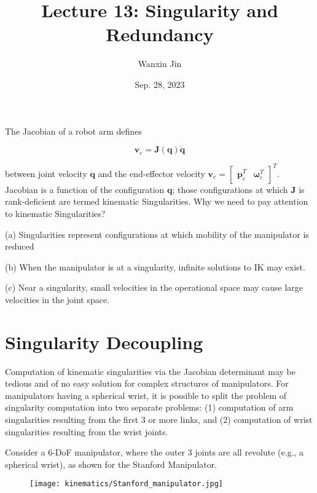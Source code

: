 \documentclass[10pt]{article}
\begin{document}
\title{Lecture 13:  Singularity and Redundancy}
\date{Sep. 28, 2023}
\author{Wanxin Jin}
\maketitle



The Jacobian of a robot arm defines

$$
\boldsymbol{v}_{e}=\boldsymbol{J}(\boldsymbol{q}) \dot{\boldsymbol{q}}
$$

between  joint velocity $\dot{\boldsymbol{q}}$ and the end-effector velocity $\boldsymbol{v}_{e}=\left[\begin{array}{ll}\dot{\boldsymbol{p}}_{e}^{T} & \boldsymbol{\omega}_{e}^{T}\end{array}\right]^{T}$. Jacobian is a function of the configuration $\boldsymbol{q}$; those configurations at which $\boldsymbol{J}$ is rank-deficient are termed kinematic Singularities. Why we need to pay attention to kinematic Singularities?

(a) Singularities represent configurations at which mobility of the manipulator is reduced

(b) When the manipulator is at a singularity, infinite solutions to IK may exist.

(c) Near a singularity, small velocities in the operational space may cause large velocities in the joint space.








\section{Singularity Decoupling}
Computation of kinematic singularities via the Jacobian determinant may be tedious and of no easy solution for complex structures of manipulators. For manipulators having a spherical wrist, it is possible to split the problem of singularity computation into two separate problems: (1) computation of arm singularities resulting from the first 3 or more links, and (2) computation of wrist singularities resulting from the wrist joints.



Consider a $6$-DoF manipulator, where the outer 3 joints are all revolute (e.g., a spherical wrist), as shown for the Stanford Manipulator. 

\begin{figure}[H]
    \centering
    \texttt{[image: kinematics/Stanford\_manipulator.jpg]}
    \label{c1.l2.fig.Stanford}
\end{figure}
\end{document}
